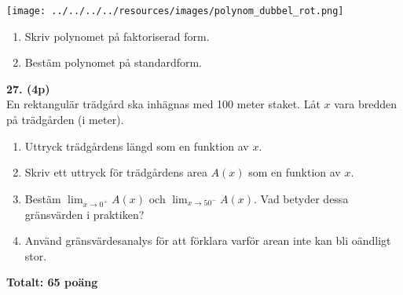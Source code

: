 \documentclass[12pt]{article}
\begin{document}
\begin{center}
 \texttt{[image: ../../../../resources/images/polynom\_dubbel\_rot.png]}
\end{center}

\begin{enumerate}[label=\alph*)]
    \item Skriv polynomet på faktoriserad form.
    \item Bestäm polynomet på standardform.
\end{enumerate}

\vspace{0.5cm}

\newpage
\noindent
\textbf{27. (4p)} \\
En rektangulär trädgård ska inhägnas med 100 meter staket. Låt $x$ vara bredden på trädgården (i meter).

\begin{enumerate}[label=\alph*)]
    \item Uttryck trädgårdens längd som en funktion av $x$.
    \item Skriv ett uttryck för trädgårdens area $A(x)$ som en funktion av $x$.
    \item Bestäm $\lim_{x \to 0^+} A(x)$ och $\lim_{x \to 50^-} A(x)$. Vad betyder dessa gränsvärden i praktiken?
    \item Använd gränsvärdesanalys för att förklara varför arean inte kan bli oändligt stor.
\end{enumerate}

\vspace{1cm}

\begin{center}
\textbf{Totalt: 65 poäng}
\end{center}
\end{document}
